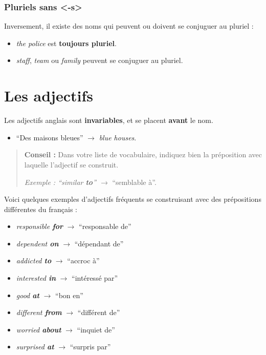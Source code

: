 \documentclass[
  10pt,
]{article}
\providecommand{\tightlist}{%
  \setlength{\itemsep}{0pt}\setlength{\parskip}{0pt}}
\begin{document}
\hypertarget{pluriels-sans--s}{%
\subsubsection{Pluriels sans \textless-s\textgreater{}}\label{pluriels-sans--s}}

Inversement, il existe des noms qui peuvent ou doivent se conjuguer au pluriel :

\begin{itemize}
\tightlist
\item
  \color[HTML]{f44336}\emph{the police} \color{black} est \textbf{toujours pluriel}.
\item
  \emph{staff}, \emph{team} ou \emph{family} peuvent se conjuguer au pluriel.
\end{itemize}

\hypertarget{les-adjectifs}{%
\section{Les adjectifs}\label{les-adjectifs}}

Les adjectifs anglais sont \textbf{invariables}, et se placent \textbf{avant} le nom.

\begin{itemize}
\tightlist
\item
  ``Des maisons bleues'' \(\rightarrow\) \emph{blue houses}.
\end{itemize}

\begin{quote}
\textbf{Conseil :} Dans votre liste de vocabulaire, indiquez bien la préposition avec laquelle l'adjectif se construit.

\emph{Exemple : ``similar \textbf{to}'' \(\rightarrow\)} ``semblable à''.
\end{quote}

Voici quelques exemples d'adjectifs fréquents se construisant avec des prépositions différentes du français :

\begin{itemize}
\tightlist
\item
  \emph{responsible \textbf{for}} \(\rightarrow\) ``responsable de''
\item
  \emph{dependent \textbf{on}} \(\rightarrow\) ``dépendant de''
\item
  \emph{addicted \textbf{to}} \(\rightarrow\) ``accroc à''
\item
  \emph{interested \textbf{in}} \(\rightarrow\) ``intéressé par''
\item
  \emph{good \textbf{at}} \(\rightarrow\) ``bon en''
\item
  \emph{different \textbf{from}} \(\rightarrow\) ``différent de''
\item
  \emph{worried \textbf{about}} \(\rightarrow\) ``inquiet de''
\item
  \emph{surprised \textbf{at}} \(\rightarrow\) ``surpris par''
\end{itemize}
\end{document}
